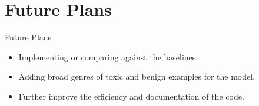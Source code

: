 \section{Future Plans}

\begin{frame}{Future Plans}

  \begin{itemize}
    \item Implementing or comparing against the baselines.
    \item Adding broad genres of toxic and benign examples for the model.
    \item Further improve the efficiency and documentation of the code.
  \end{itemize}

\end{frame}
